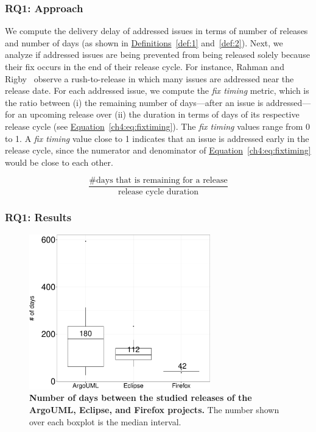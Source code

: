 \subsubsection*{RQ1: Approach} 

We compute the delivery delay of addressed issues in terms of number of releases
and number of days (as shown in \hyperref[def:1]{Definitions}~\ref{def:1}
and~\ref{def:2}). Next, we analyze if addressed issues are being prevented from
being released solely because their fix occurs in the end of their release
cycle. For instance, Rahman and Rigby~\cite{rahman2015release} observe a
rush-to-release in which many issues are addressed near the release date. For
each addressed issue, we compute the {\em fix timing} metric, which is the ratio
between (i) the remaining number of days---after an issue is addressed---for an
upcoming release over (ii) the duration in terms of days of its respective
release cycle (see
\hyperref[ch4:eq:fixtiming]{Equation}~\ref{ch4:eq:fixtiming}). The {\em fix
timing} values range from 0 to 1. A {\em fix timing} value close to 1 indicates
that an issue is addressed early in the release cycle, since the numerator and
denominator of \hyperref[ch4:eq:fixtiming]{Equation}~\ref{ch4:eq:fixtiming}
would be close to each other.

\begin{equation}
	\frac{\text{\# days that is remaining for a release}}{\text{release cycle duration}}
	\label{ch4:eq:fixtiming}
\end{equation}

\subsubsection*{RQ1: Results} \label{results:rq1}

\begin{figure}[!t]
	\centering
	\includegraphics[width=0.7\textwidth]
	{chapters/chapter4/figures/RQ1_time_between_releases.pdf}
	\caption{\textbf{Number of days between the studied releases of the
	ArgoUML, Eclipse, and Firefox projects.} The number shown over each
boxplot is the median interval.}  
	\label{ch4:fig:releaseIntervals}
\end{figure}

